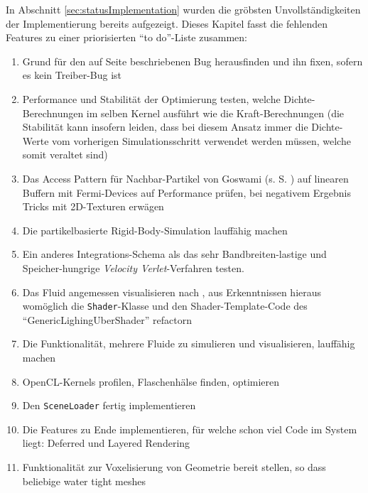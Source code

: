   	In Abschnitt \ref{sec:statusImplementation} wurden die gröbsten Unvollständigkeiten der Implementierung
	bereits aufgezeigt. Dieses Kapitel fasst die fehlenden Features zu einer priorisierten
	"`to do"'-Liste zusammen:\\
	\begin{enumerate}
		\item Grund für den auf Seite \pageref{enum:oclSyncBug} beschriebenen Bug herausfinden und ihn fixen,
		sofern es kein Treiber-Bug ist
		\item Performance und Stabilität der Optimierung testen, welche Dichte-Berechnungen im selben
		Kernel ausführt wie die Kraft-Berechnungen (die Stabilität kann insofern leiden, dass bei diesem Ansatz
		immer die Dichte-Werte vom vorherigen Simulationsschritt verwendet werden müssen, welche somit veraltet sind)
		\item Das Access Pattern für Nachbar-Partikel von Goswami (s. S. \pageref{enum:goswamiAccessPattern})
			 auf linearen Buffern mit Fermi-Devices auf Performance prüfen, bei negativem Ergebnis Tricks mit 2D-Texturen
			 erwägen
		\item Die partikelbasierte Rigid-Body-Simulation lauffähig machen
		\item Ein anderes Integrations-Schema als das sehr Bandbreiten-lastige und Speicher-hungrige 
			\emph{Velocity Verlet}-Verfahren testen.
		\item Das Fluid angemessen visualisieren nach \cite{Green2009FluidRenderingCurvatureFlow}, aus Erkenntnissen
		hieraus womöglich die \lstinline|Shader|-Klasse und den Shader-Template-Code des
		"`GenericLighingUberShader"' refactorn
		\item Die Funktionalität, mehrere Fluide zu simulieren und visualisieren, lauffähig machen
		\item OpenCL-Kernels profilen, Flaschenhälse finden, optimieren
		\item Den \lstinline|SceneLoader| fertig implementieren
		\item Die Features zu Ende implementieren, für welche schon viel Code im System liegt: 
		Deferred und Layered Rendering
		\item Funktionalität zur Voxelisierung von Geometrie bereit stellen, so dass beliebige water tight meshes

\end{enumerate}
